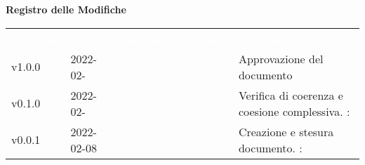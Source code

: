 

{\LARGE{\textbf{Registro delle Modifiche}}} \\
\begin{table}[!htbp]
\renewcommand{\arraystretch}{1.5}
\begin{tabular}{ m{}<{\centering}  m{}<{\centering}  m{}<{\centering}  m{}<{\centering}  m{}<{\centering} }
	\rowcolor{darkblue}
	\textcolor{white}{\textbf{Versione}} &\textcolor{white}{\textbf{Data}}& \textcolor{white}{\textbf{Nominativo}} & \textcolor{white}{\textbf{Ruolo}}&\textcolor{white}{\textbf{Descrizione}}\\ 

	v1.0.0 & 2022-02- & \ & \RE & Approvazione del documento \\

	v0.1.0& 2022-02- & \GC & \VE & Verifica di coerenza e coesione complessiva. \VE: \textit{}\\

	v0.0.1& 2022-02-08& \GC &\AN & Creazione e stesura documento. \VE: \textit{}\\

\end{tabular}
\end{table}

\pagebreak
